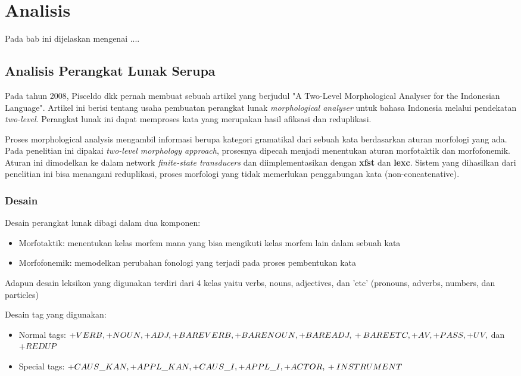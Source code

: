 \chapter{Analisis}
\label{chap:analisis}

Pada bab ini dijelaskan mengenai ....

\section{Analisis Perangkat Lunak Serupa}
\label{sec:mpYangSudahAda}

Pada tahun 2008, Pisceldo dkk pernah membuat sebuah artikel yang berjudul "A Two-Level Morphological Analyser for the Indonesian Language"\cite{manurung:08:indonesian}. Artikel ini berisi tentang usaha pembuatan perangkat lunak \textit{morphological analyser} untuk bahasa Indonesia melalui pendekatan \textit{two-level}. Perangkat lunak ini dapat memproses kata yang merupakan hasil afiksasi dan reduplikasi. 

Proses morphological analysis mengambil informasi berupa kategori gramatikal dari sebuah kata berdasarkan aturan morfologi yang ada. Pada penelitian ini dipakai \textit{two-level morphology approach}, prosesnya dipecah menjadi menentukan aturan morfotaktik dan morfofonemik. Aturan ini dimodelkan ke dalam network \textit{finite-state transducers} dan diimplementasikan dengan \textbf{xfst} dan \textbf{lexc}. Sistem yang dihasilkan dari penelitian ini bisa menangani reduplikasi, proses morfologi yang tidak memerlukan penggabungan kata (non-concatenative).

\subsection{Desain}
\label{sec:desainMPYangSudahAda}

Desain perangkat lunak dibagi dalam dua komponen:
	\begin{itemize}
		\item Morfotaktik: menentukan kelas morfem mana yang bisa mengikuti kelas morfem lain dalam sebuah kata
		\item Morfofonemik: memodelkan perubahan fonologi yang terjadi pada proses pembentukan kata
	\end{itemize}

Adapun desain leksikon yang digunakan terdiri dari 4 kelas yaitu verbs, nouns, adjectives, dan 'etc' (pronouns, adverbs, numbers, dan particles)

Desain tag yang digunakan:
	\begin{itemize}
		\item Normal tags: $+VERB, +NOUN, +ADJ, +BAREVERB, +BARENOUN, +BAREADJ, \\+BAREETC, +AV, +PASS, +UV,$ dan $+REDUP$
		\item Special tags: $+CAUS\_KAN, +APPL\_KAN, +CAUS\_I, +APPL\_I, +ACTOR, \\+INSTRUMENT$
	\end{itemize}
	
